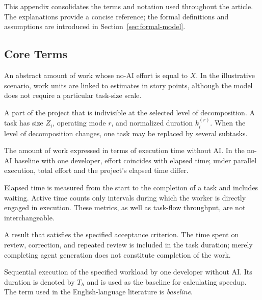 \label{sec:terms}

This appendix consolidates the terms and notation used throughout the article.
The explanations provide a concise reference; the formal definitions and
assumptions are introduced in Section~\ref{sec:formal-model}.

\subsection{Core Terms}

\begin{description}[style=nextline]
  \item[Work Unit] An abstract amount of work whose no-AI effort is equal to
  $X$. In the illustrative scenario, work units are linked to estimates in
  story points, although the model does not require a particular task-size
  scale.

  \item[Task] A part of the project that is indivisible at the selected level
  of decomposition. A task has size $Z_i$, operating mode $r$, and normalized
  duration $k_i^{(r)}$. When the level of decomposition changes, one task may
  be replaced by several subtasks.

  \item[Effort] The amount of work expressed in terms of execution time without
  AI\@. In the no-AI baseline with one developer, effort coincides with elapsed
  time; under parallel execution, total effort and the project's elapsed time
  differ.

  \item[Elapsed and Active Time] Elapsed time is measured from the start to the
  completion of a task and includes waiting. Active time counts only intervals
  during which the worker is directly engaged in execution. These metrics, as
  well as task-flow throughput, are not interchangeable.

  \item[Accepted Result] A result that satisfies the specified acceptance
  criterion. The time spent on review, correction, and repeated review is
  included in the task duration; merely completing agent generation does not
  constitute completion of the work.

  \item[No-AI Baseline] Sequential execution of the specified workload by one
  developer without AI\@. Its duration is denoted by $T_h$ and is used as the
  baseline for calculating speedup. The term used in the English-language
  literature is \emph{baseline}.


\end{description}
